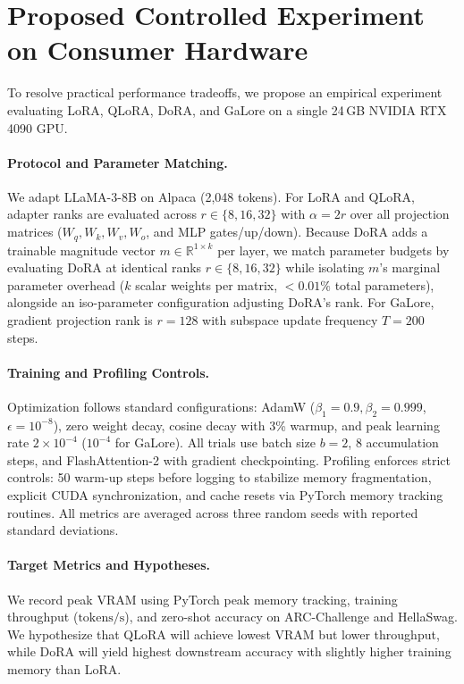 \documentclass[11pt,a4paper]{article}
\begin{document}
\section{Proposed Controlled Experiment on Consumer Hardware}

To resolve practical performance tradeoffs, we propose an empirical experiment evaluating LoRA, QLoRA, DoRA, and GaLore on a single 24\,GB NVIDIA RTX 4090 GPU.

\paragraph{Protocol and Parameter Matching.} We adapt LLaMA-3-8B on Alpaca (2,048 tokens). For LoRA and QLoRA, adapter ranks are evaluated across $r \in \{8, 16, 32\}$ with $\alpha = 2r$ over all projection matrices ($W_q, W_k, W_v, W_o$, and MLP gates/up/down). Because DoRA adds a trainable magnitude vector $m \in \mathbb{R}^{1 \times k}$ per layer, we match parameter budgets by evaluating DoRA at identical ranks $r \in \{8, 16, 32\}$ while isolating $m$'s marginal parameter overhead ($k$ scalar weights per matrix, $<0.01\%$ total parameters), alongside an iso-parameter configuration adjusting DoRA's rank. For GaLore, gradient projection rank is $r=128$ with subspace update frequency $T=200$ steps.

\paragraph{Training and Profiling Controls.} Optimization follows standard configurations: AdamW ($\beta_1 = 0.9, \beta_2 = 0.999$, $\epsilon = 10^{-8}$), zero weight decay, cosine decay with 3\% warmup, and peak learning rate $2\times 10^{-4}$ ($10^{-4}$ for GaLore). All trials use batch size $b=2$, 8 accumulation steps, and FlashAttention-2 with gradient checkpointing. Profiling enforces strict controls: 50 warm-up steps before logging to stabilize memory fragmentation, explicit CUDA synchronization, and cache resets via PyTorch memory tracking routines. All metrics are averaged across three random seeds with reported standard deviations.

\paragraph{Target Metrics and Hypotheses.} We record peak VRAM using PyTorch peak memory tracking, training throughput ($\text{tokens/s}$), and zero-shot accuracy on ARC-Challenge and HellaSwag. We hypothesize that QLoRA will achieve lowest VRAM but lower throughput, while DoRA will yield highest downstream accuracy with slightly higher training memory than LoRA.
\end{document}
